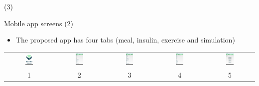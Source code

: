 \begin{frame}{ (3)}
\begin{block}{Mobile app screens (2)} 
\begin{itemize}
\item The proposed app has four tabs (meal, insulin, exercise and simulation)
\end{itemize}
\begin{center}
     \begin{tabular}{ccccc}
\includegraphics[width=0.17\textwidth]{Figs/Pantalla0_AEDMA}     &
\includegraphics[width=0.17\textwidth]{Figs/Pantalla1_AEDMA}     &
\includegraphics[width=0.17\textwidth]{Figs/Pantalla2_AEDMA}     &
\includegraphics[width=0.17\textwidth]{Figs/Pantalla3_AEDMA}     &        
\includegraphics[width=0.17\textwidth]{Figs/Pantalla4_AEDMA} \\ 
1 & 2 & 3 & 4 & 5 \\
          \end{tabular}
\end{center}
\end{block} 
\end{frame}

